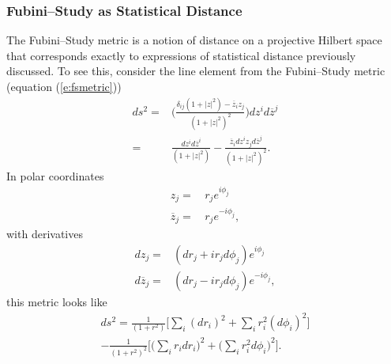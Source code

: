\subsubsection{Fubini--Study as Statistical Distance}

The Fubini--Study metric is a notion of distance on a projective
Hilbert space that corresponds exactly to expressions of statistical
distance previously discussed.  To see this, consider the 
line element from the Fubini--Study
metric 
(equation (\ref{e:fsmetric})) 
\begin{equation}
\begin{split}
ds^2 =& \biggl(
            \frac{\delta_{ij}\left( 1 + |z|^2 \right) - \overline{z}_iz_j}
                 { \left( 1 + |z|^2 \right)^2 }
       \biggr)
       dz^id\overline{z}^j\\
=& \frac{ dz^id\overline{z}^i }{ \left( 1 + |z|^2 \right) }
- \frac{ \overline{z}_idz^iz_jd\overline{z}^j }
                 { \left( 1 + |z|^2 \right)^2 }.
\end{split}
\end{equation}
In polar coordinates
\begin{equation}
\begin{split}
z_j=&\,r_je^{i\phi_j}\\
\overline{z}_j=&\,r_je^{-i\phi_j},
\end{split}
\end{equation}
with derivatives
\begin{equation}
\begin{split}
dz_j =& \left( dr_j + ir_jd\phi_j \right) e^{i\phi_j}\\
d\overline{z}_j =& \left( dr_j - ir_jd\phi_j \right) e^{-i\phi_j},
\end{split}
\end{equation}
this metric looks like
\begin{multline}
ds^2 = \frac{1}{\left( 1+r^2 \right)}
    \biggl[\sum_i\left(dr_i\right)^2 + \sum_i r_i^2\left(d\phi_i\right)^2\biggr]\\
- \frac{1}{\left( 1+r^2 \right)^2}
    \biggl[\biggl(\sum_i r_idr_i\biggr)^2
           + \biggl(\sum_i r_i^2d\phi_i\biggr)^2
    \biggr].
\label{e:fsPolar}
\end{multline}

